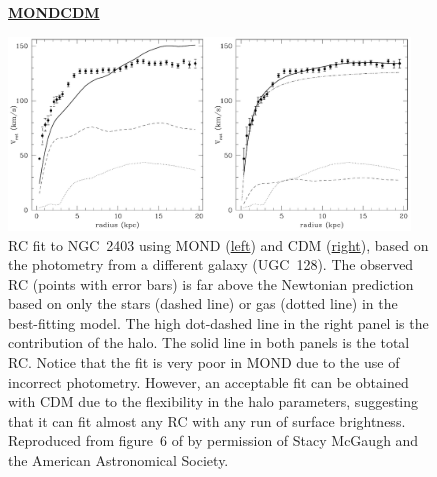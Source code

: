 \documentclass[fleqn,usenatbib,useAMS,onecolumn]{mnras} %
\begin{document}
\begin{figure}
	\centering
	\qquad\textbf{\underline{MOND}}\qquad\qquad\qquad\qquad\qquad\qquad\qquad\qquad\qquad\qquad\qquad\qquad\qquad\textbf{\underline{CDM}}\par\medskip
	\includegraphics[width=0.95\textwidth]{de_Blok_1998_Figure_6}
	\caption{RC fit to NGC~2403 using MOND (\underline{left}) and CDM (\underline{right}), based on the photometry from a different galaxy (UGC~128). The observed RC (points with error bars) is far above the Newtonian prediction based on only the stars (dashed line) or gas (dotted line) in the best-fitting model. The high dot-dashed line in the right panel is the contribution of the halo. The solid line in both panels is the total RC. Notice that the fit is very poor in MOND due to the use of incorrect photometry. However, an acceptable fit can be obtained with CDM due to the flexibility in the halo parameters, suggesting that it can fit almost any RC with any run of surface brightness. Reproduced from figure~6 of \citet{Blok_1998} by permission of Stacy McGaugh and the American Astronomical Society.}
	\label{de_Blok_1998_Figure_6}
\end{figure}
\end{document}
